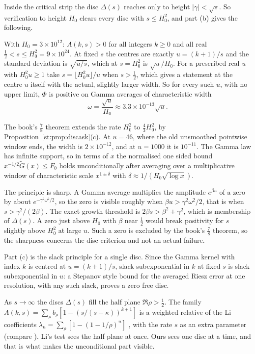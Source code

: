 Inside the critical strip the disc $\Delta(s)$ reaches only to height $|\gamma|<\sqrt s$. So verification to height $H_0$ clears every disc with $s\le H_0^2$, and part (b) gives the following.
\begin{corollary}\label{st:cor:principle}
With $H_0=3\times10^{12}$: $A(k,s)>0$ for all integers $k\ge0$ and all real $\tfrac12<s\le H_0^2=9\times10^{24}$. At fixed $s$ the centres are exactly $u=(k+1)/s$ and the standard deviation is $\sqrt{u/s}$, which at $s=H_0^2$ is $\sqrt u/H_0$. For a prescribed real $u$ with $H_0^2u\ge1$ take $s=\lfloor H_0^2u\rfloor/u$ when $s>\tfrac12$, which gives a statement at the centre $u$ itself with the actual, slightly larger width. So for every such $u$, with no upper limit, $\Phi$ is positive on Gamma averages of characteristic width
\[
\omega=\frac{\sqrt u}{H_0}\approx3.3\times10^{-13}\sqrt u .
\]
\end{corollary}
The book's $\tfrac78$ theorem extends the rate $H_0^2$ to $\tfrac43H_0^2$, by Proposition~\ref{st:prop:discask}(c). At $u=46$, where the old unsmoothed pointwise window ends, the width is $2\times10^{-12}$, and at $u=1000$ it is $10^{-11}$. The Gamma law has infinite support, so in terms of $x$ the normalised one sided bound $x^{-1/2}\widetilde G(x)\le F_0$ holds unconditionally after averaging over a multiplicative window of characteristic scale $x^{1\pm\delta}$ with $\delta\approx1/(H_0\sqrt{\log x})$.

The principle is sharp. A Gamma average multiplies the amplitude $e^{\beta u}$ of a zero by about $e^{-\gamma^2\omega^2/2}$, so the zero is visible roughly when $\beta u>\gamma^2\omega^2/2$, that is when $s>\gamma^2/(2\beta)$. The exact growth threshold is $2\beta s>\beta^2+\gamma^2$, which is membership of $\Delta(s)$. A zero just above $H_0$ with $\beta$ near $\tfrac12$ would break positivity for $s$ slightly above $H_0^2$ at large $u$. Such a zero is excluded by the book's $\tfrac78$ theorem, so the sharpness concerns the disc criterion and not an actual failure.

Part (c) is the slack principle for a single disc. Since the Gamma kernel with index $k$ is centred at $u=(k+1)/s$, slack subexponential in $k$ at fixed $s$ is slack subexponential in $u$: a Stepanov style bound for the averaged Riesz error at one resolution, with any such slack, proves a zero free disc.

As $s\to\infty$ the discs $\Delta(s)$ fill the half plane $\Re\rho>\tfrac12$. The family $A(k,s)=\sum_\rho b_\rho[1-(s/(s-\kappa))^{k+1}]$ is a weighted relative of the Li coefficients $\lambda_n=\sum_\rho[1-(1-1/\rho)^n]$ \cite{Li97,BL99}, with the rate $s$ as an extra parameter (compare \cite{Sekatskii14}). Li's test sees the half plane at once. Ours sees one disc at a time, and that is what makes the unconditional part visible.

